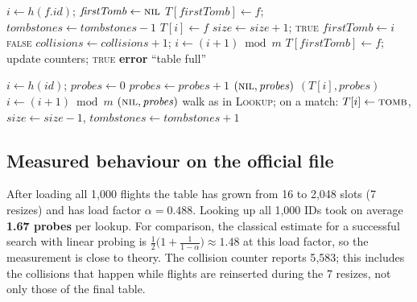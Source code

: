 \documentclass[11pt]{article}
\begin{document}
\begin{algorithm}[ht]
\caption{Registry insert (matches \texttt{HashRegistry.insert})}
\begin{algorithmic}[1]
    \EndIf
  \State $i \gets h(f.\mathit{id})$; \quad $\mathit{firstTomb} \gets \textsc{nil}$
        \State $T[\mathit{firstTomb}] \gets f$; \quad $\mathit{tombstones} \gets \mathit{tombstones}-1$
      \Else
        \State $T[i] \gets f$
      \EndIf
      \State $\mathit{size} \gets \mathit{size}+1$; \Return \textsc{true}
       $\mathit{firstTomb} \gets i$ \EndIf
      \State \Return \textsc{false} 
    \EndIf
    \State $\mathit{collisions} \gets \mathit{collisions}+1$; \quad $i \gets (i+1) \bmod m$
  \EndFor
    \State $T[\mathit{firstTomb}] \gets f$; update counters; \Return \textsc{true}
  \EndIf
  \State \textbf{error} ``table full''
\EndProcedure
\end{algorithmic}
\end{algorithm}

\begin{algorithm}[ht]
\caption{Registry lookup and delete (match \texttt{lookup}, \texttt{delete})}
\begin{algorithmic}[1]
  \State $i \gets h(\mathit{id})$; \quad $\mathit{probes} \gets 0$
    \State $\mathit{probes} \gets \mathit{probes}+1$
     \Return $(\textsc{nil}, \mathit{probes})$
     \Return $(T[i], \mathit{probes})$
    \EndIf
    \State $i \gets (i+1) \bmod m$
  \EndFor
  \State \Return $(\textsc{nil}, \mathit{probes})$
\EndProcedure
\Statex
{}
  \State walk as in \textsc{Lookup}; on a match: $T[i] \gets \textsc{tomb}$,
  $\mathit{size} \gets \mathit{size}-1$, $\mathit{tombstones} \gets \mathit{tombstones}+1$
\EndProcedure
\end{algorithmic}
\end{algorithm}

\subsection{Measured behaviour on the official file}
After loading all 1{,}000 flights the table has grown from 16 to 2{,}048 slots
(7 resizes) and has load factor $\alpha = 0.488$. Looking up all 1{,}000 IDs
took on average \textbf{1.67 probes} per lookup.
For comparison, the classical estimate for a successful search with linear
probing is $\tfrac12\bigl(1 + \tfrac{1}{1-\alpha}\bigr) \approx 1.48$ at this
load factor, so the measurement is close to theory.
The collision counter reports 5{,}583; this includes the collisions that happen
while flights are reinserted during the 7 resizes, not only those of the final
table.
\end{document}
